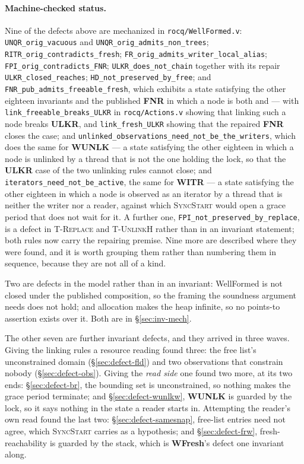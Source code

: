 \paragraph{Machine-checked status.}  Nine of the defects above are mechanized
in \texttt{rocq/WellFormed.v}: \texttt{UNQR\_orig\_vacuous} and
\texttt{UNQR\_orig\_admits\_non\_trees};
\texttt{RITR\_orig\_contradicts\_fresh};
\texttt{FR\_orig\_admits\_writer\_local\_alias};
\texttt{FPI\_orig\_contradicts\_FNR}; \texttt{ULKR\_does\_not\_chain}
together with its repair \texttt{ULKR\_closed\_reaches};
\texttt{HD\_not\_preserved\_by\_free}; and
\texttt{FNR\_pub\_admits\_freeable\_fresh}, which exhibits a state satisfying
the other eighteen invariants and the published \textbf{FNR} in which a node
is both \frsh{} and \frbl{} --- with \texttt{link\_freeable\_breaks\_ULKR} in
\texttt{rocq/Actions.v} showing that linking such a node breaks \textbf{ULKR},
and \texttt{link\_fresh\_ULKR} showing that the repaired \textbf{FNR} closes
the case; and
\texttt{unlinked\_observations\_need\_not\_be\_the\_writers}, which does the same
for \textbf{WUNLK} --- a state satisfying the other eighteen in which a node is
unlinked by a thread that is not the one holding the lock, so that the
\textbf{ULKR} case of the two unlinking rules cannot close; and
\texttt{iterators\_need\_not\_be\_active}, the same for \textbf{WITR} --- a state
satisfying the other eighteen in which a node is observed as an iterator by a
thread that is neither the writer nor a reader, against which
\textsc{SyncStart} would open a grace period that does not wait for it.  A
further one,
\texttt{FPI\_not\_preserved\_by\_replace}, is a defect in
\textsc{T-Replace} and \textsc{T-UnlinkH} rather than in an invariant
statement; both rules now carry the repairing premise.  Nine more are described
where they were found, and it is worth grouping them rather than numbering them
in sequence, because they are not all of a kind.

Two are defects in the model rather than in an invariant: \textsf{WellFormed} is
not closed under the published composition, so the framing the soundness
argument needs does not hold; and allocation makes the heap infinite, so no
points-to assertion exists over it.  Both are in \S\ref{sec:inv-mech}.

The other seven are further invariant defects, and they arrived in three waves.
Giving the linking rules a resource reading found three: the free list's
unconstrained domain (\S\ref{sec:defect-fld}) and two observations that
constrain nobody (\S\ref{sec:defect-obs}).  Giving the \emph{read side} one
found two more, at its two ends: \S\ref{sec:defect-br}, the bounding set is
unconstrained, so nothing makes the grace period terminate; and
\S\ref{sec:defect-wunlkw}, \textbf{WUNLK} is guarded by the lock, so it says
nothing in the state a reader starts in.  Attempting the reader's own read found
the last two: \S\ref{sec:defect-samesnap}, free-list entries need not agree,
which \textsc{SyncStart} carries as a hypothesis; and \S\ref{sec:defect-frw},
fresh-reachability is guarded by the stack, which is \textbf{WFresh}'s defect
one invariant along.

